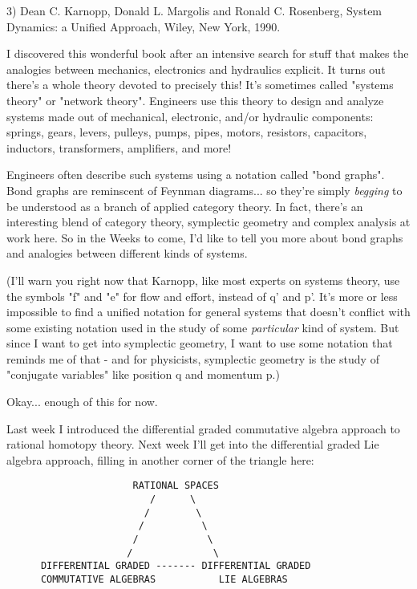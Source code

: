 3) Dean C. Karnopp, Donald L. Margolis and Ronald C. Rosenberg,
System Dynamics: a Unified Approach, Wiley, New York, 1990.

I discovered this wonderful book after an intensive search for stuff
that makes the analogies between mechanics, electronics and hydraulics
explicit.  It turns out there's a whole theory devoted to precisely
this!  It's sometimes called "systems theory" or
"network theory".  Engineers use this theory to design and
analyze systems made out of mechanical, electronic, and/or hydraulic
components: springs, gears, levers, pulleys, pumps, pipes, motors,
resistors, capacitors, inductors, transformers, amplifiers, and more!

Engineers often describe such systems using a notation called
"bond graphs".  Bond graphs are reminscent of Feynman
diagrams... so they're simply \emph{begging} to be understood as a
branch of applied category theory.  In fact, there's an interesting
blend of category theory, symplectic geometry and complex analysis at
work here.  So in the Weeks to come, I'd like to tell you more about
bond graphs and analogies between different kinds of systems.

(I'll warn you right now that Karnopp, like most experts on systems
theory, use the symbols "f" and "e" for flow and effort, instead of q'
and p'.  It's more or less impossible to find a unified notation for
general systems that doesn't conflict with some existing notation
used in the study of some \emph{particular} kind of system.  But since I
want to get into symplectic geometry, I want to use some notation that
reminds me of that - and for physicists, symplectic geometry is the
study of "conjugate variables" like position q and momentum p.)

Okay... enough of this for now.  

Last week I introduced the differential graded commutative algebra
approach to rational homotopy theory.  Next week I'll get into the
differential graded Lie algebra approach, filling in another corner 
of the triangle here:

\begin{verbatim}
                      RATIONAL SPACES
                         /      \  
                        /        \  
                       /          \  
                      /            \
                     /              \
      DIFFERENTIAL GRADED ------- DIFFERENTIAL GRADED
      COMMUTATIVE ALGEBRAS           LIE ALGEBRAS
\end{verbatim}
    
